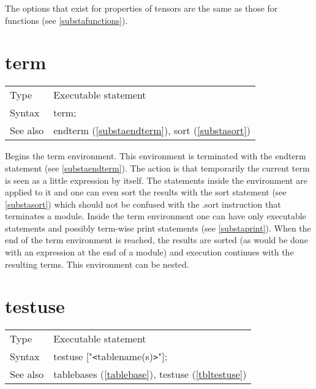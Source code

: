 \noindent The options that exist for properties of tensors are the same as 
those for functions (see \ref{substafunctions}). \vspace{10mm}


\section{term}
\label{substaterm}

\noindent \begin{tabular}{ll}
Type & Executable statement\\
Syntax & term;
\\ See also & endterm (\ref{substaendterm}), sort (\ref{substasort})
\end{tabular} \vspace{4mm}

\noindent Begins the term environment. 
This environment is terminated with the endterm statement 
(see \ref{substaendterm}). The action is that temporarily the current term 
is seen as a little expression by itself. The statements inside the 
environment are applied to it and one can even sort the results with the 
sort statement (see \ref{substasort}) which should not be 
confused with the .sort instruction that terminates a module. 
Inside the term environment one can have only executable statements and 
possibly term-wise print statements (see \ref{substaprint}). When the end 
of the term environment is reached, the results are sorted (as would be 
done with an expression at the end of a module) and execution continues 
with the resulting terms. This environment can be nested. 
\vspace{10mm}


\section{testuse}
\label{substatestuse}

\noindent \begin{tabular}{ll}
Type & Executable statement\\
Syntax & testuse ["{\tt<}tablename(s){\tt>}"];
\\ See also & tablebases (\ref{tablebase}), testuse (\ref{tbltestuse})
\end{tabular} \vspace{4mm}

